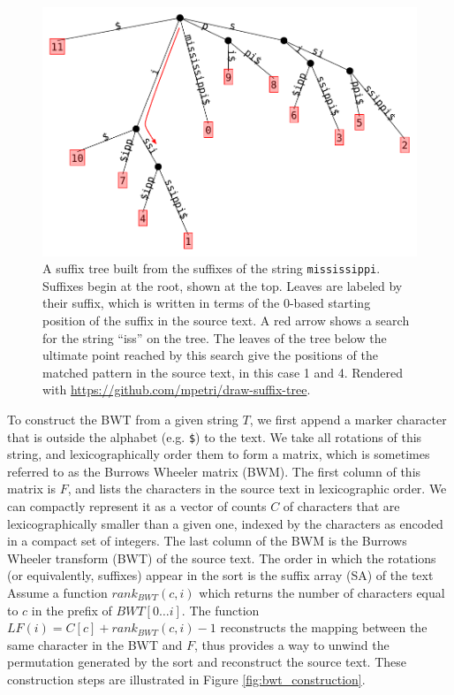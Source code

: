 \begin{figure}[htbp!]
  \includegraphics[width=\textwidth]{Chapter2/Figs/mississippi_suffix_tree.pdf}
  \caption[An example of a suffix tree]{
    A suffix tree built from the suffixes of the string {\tt mississippi}.
    Suffixes begin at the root, shown at the top.
    Leaves are labeled by their suffix, which is written in terms of the 0-based starting position of the suffix in the source text.
    A red arrow shows a search for the string ``iss'' on the tree.
    The leaves of the tree below the ultimate point reached by this search give the positions of the matched pattern in the source text, in this case 1 and 4.
    Rendered with \url{https://github.com/mpetri/draw-suffix-tree}.
  }
  \label{fig:suffix_tree}
\end{figure}

To construct the BWT from a given string $T$, we first append a marker character that is outside the alphabet (e.g. {\tt \$}) to the text.
We take all rotations of this string, and lexicographically order them to form a matrix, which is sometimes referred to as the Burrows Wheeler matrix (BWM).
The first column of this matrix is $F$, and lists the characters in the source text in lexicographic order.
We can compactly represent it as a vector of counts $C$ of characters that are lexicographically smaller than a given one, indexed by the characters as encoded in a compact set of integers.
The last column of the BWM is the Burrows Wheeler transform (BWT) of the source text.
The order in which the rotations (or equivalently, suffixes) appear in the sort is the suffix array (SA) of the text
Assume a function $rank_{BWT}(c, i)$ which returns the number of characters equal to $c$ in the prefix of $BWT[0\ldots i]$.
The function $LF(i) = C[c] + rank_{BWT}(c, i) - 1$ reconstructs the mapping between the same character in the BWT and $F$, thus provides a way to unwind the permutation generated by the sort and reconstruct the source text.
These construction steps are illustrated in Figure \ref{fig:bwt_construction}.

